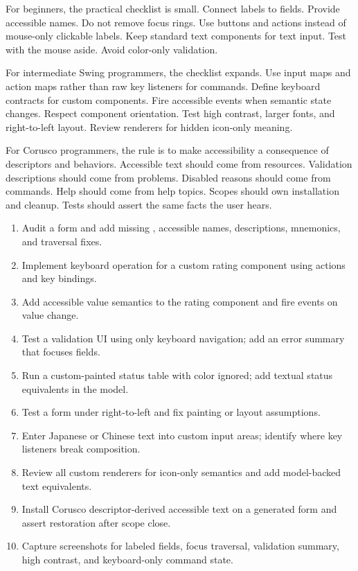 For beginners, the practical checklist is small. Connect labels to fields. Provide accessible names. Do not remove focus rings. Use buttons and actions instead of mouse-only clickable labels. Keep standard text components for text input. Test with the mouse aside. Avoid color-only validation.

For intermediate Swing programmers, the checklist expands. Use input maps and action maps rather than raw key listeners for commands. Define keyboard contracts for custom components. Fire accessible events when semantic state changes. Respect component orientation. Test high contrast, larger fonts, and right-to-left layout. Review renderers for hidden icon-only meaning.

For Corusco programmers, the rule is to make accessibility a consequence of descriptors and behaviors. Accessible text should come from resources. Validation descriptions should come from problems. Disabled reasons should come from commands. Help should come from help topics. Scopes should own installation and cleanup. Tests should assert the same facts the user hears.

\begin{exercisebox}
\begin{enumerate}
\item Audit a form and add missing , accessible names, descriptions, mnemonics, and traversal fixes.
\item Implement keyboard operation for a custom rating component using actions and key bindings.
\item Add accessible value semantics to the rating component and fire events on value change.
\item Test a validation UI using only keyboard navigation; add an error summary that focuses fields.
\item Run a custom-painted status table with color ignored; add textual status equivalents in the model.
\item Test a form under right-to-left  and fix painting or layout assumptions.
\item Enter Japanese or Chinese text into custom input areas; identify where key listeners break composition.
\item Review all custom renderers for icon-only semantics and add model-backed text equivalents.
\item Install Corusco descriptor-derived accessible text on a generated form and assert restoration after scope close.
\item Capture screenshots for labeled fields, focus traversal, validation summary, high contrast, and keyboard-only command state.
\end{enumerate}
\end{exercisebox}

